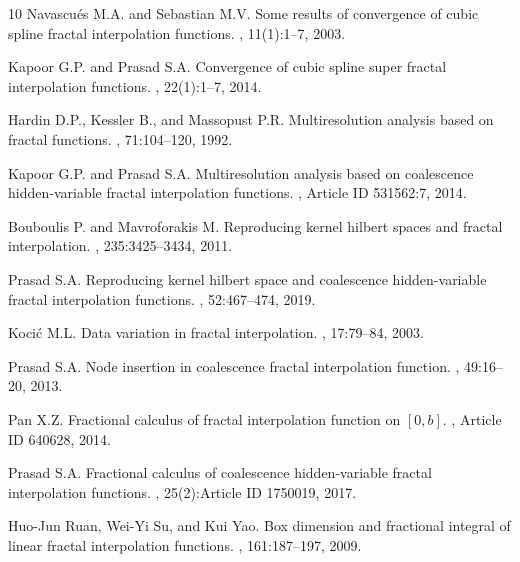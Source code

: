 \documentclass[sn-mathphys-num]{sn-jnl}
\numberwithin{equation}{section}
\begin{document}
\begin{thebibliography}{10}
{Navascu\'es M.A.} and {Sebastian M.V.}
\newblock Some results of convergence of cubic spline fractal interpolation functions.
, 11(1):1--7, 2003.

{Kapoor G.P.} and {Prasad S.A.}
\newblock Convergence of cubic spline super fractal interpolation functions.
, 22(1):1--7, 2014.

{Hardin D.P.}, {Kessler B.}, and {Massopust P.R.}
\newblock Multiresolution analysis based on fractal functions.
, 71:104--120, 1992.

{Kapoor G.P.} and {Prasad S.A.}
\newblock Multiresolution analysis based on coalescence hidden-variable fractal interpolation functions.
, Article ID 531562:7, 2014.

{Bouboulis P.} and {Mavroforakis M.}
\newblock Reproducing kernel hilbert spaces and fractal interpolation.
, 235:3425--3434, 2011.

{Prasad S.A.}
\newblock Reproducing kernel hilbert space and coalescence hidden-variable fractal interpolation functions.
, 52:467--474, 2019.

{Koci\'c M.L}.
\newblock Data variation in fractal interpolation.
, 17:79--84, 2003.

{Prasad S.A.}
\newblock Node insertion in coalescence fractal interpolation function.
, 49:16--20, 2013.

{Pan X.Z.}
\newblock Fractional calculus of fractal interpolation function on $[0,b]$.
, Article ID 640628, 2014.

{Prasad S.A.}
\newblock Fractional calculus of coalescence hidden-variable fractal interpolation functions.
, 25(2):Article ID 1750019, 2017.

{Huo-Jun Ruan}, {Wei-Yi Su}, and {Kui Yao}.
\newblock Box dimension and fractional integral of linear fractal interpolation functions.
, 161:187--197, 2009.


\end{thebibliography}
\end{document}
